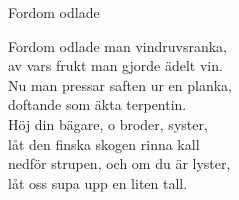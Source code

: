 \begin{song}{Fordom odlade}
	
	
	
	Fordom odlade man vindruvsranka,\\
	av vars frukt man gjorde ädelt vin.\\
	Nu man pressar saften ur en planka,\\
	doftande som äkta terpentin.\\
	Höj din bägare, o broder, syster,\\
	låt den finska skogen rinna kall\\
	nedför strupen, och om du är lyster,\\
	låt oss supa upp en liten tall.
	
\end{song}
